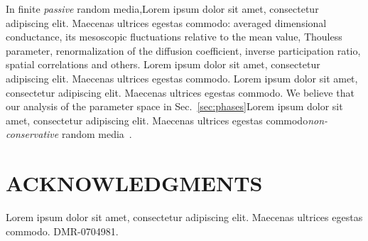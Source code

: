 In finite {\it passive} random media,Lorem ipsum dolor sit amet, consectetur adipiscing elit. Maecenas ultrices egestas commodo: averaged dimensional conductance, its mesoscopic fluctuations relative to the mean value, Thouless parameter, renormalization of the diffusion coefficient, inverse participation ratio, spatial correlations and others. Lorem ipsum dolor sit amet, consectetur adipiscing elit. Maecenas ultrices egestas commodo. Lorem ipsum dolor sit amet, consectetur adipiscing elit. Maecenas ultrices egestas commodo. We believe that our analysis of the parameter space in Sec.~\ref{sec:phases}Lorem ipsum dolor sit amet, consectetur adipiscing elit. Maecenas ultrices egestas commodo{\it non-conservative} random media~\cite{2010_Payne_loc_criterion,2010_Payne_TE}.

\section{ACKNOWLEDGMENTS}
Lorem ipsum dolor sit amet, consectetur adipiscing elit. Maecenas ultrices egestas commodo. DMR-0704981. 


